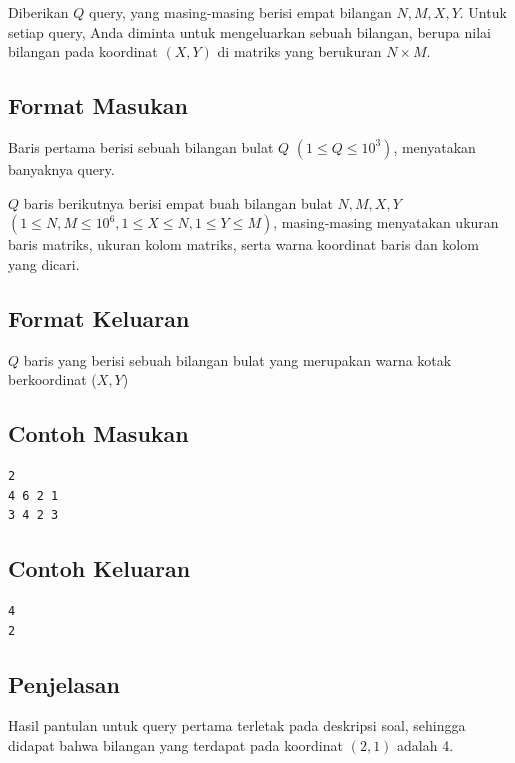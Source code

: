 \documentclass{article}
\begin{document}
Diberikan $Q$ query, yang masing-masing berisi empat bilangan $N, M, X, Y$. Untuk setiap query, Anda diminta untuk mengeluarkan sebuah bilangan, berupa nilai bilangan pada koordinat $(X, Y)$ di matriks yang berukuran $N \times M$.

\subsection*{Format Masukan}
Baris pertama berisi sebuah bilangan bulat $Q$ $(1 \leq Q \leq 10^3)$, menyatakan banyaknya query.

$Q$ baris berikutnya berisi empat buah bilangan bulat $N, M, X, Y$ $(1 \leq N, M \leq 10^6, 1 \leq X \leq N, 1 \leq Y \leq M)$, masing-masing menyatakan ukuran baris matriks, ukuran kolom matriks, serta warna koordinat baris dan kolom yang dicari.

\subsection*{Format Keluaran}
$Q$ baris yang berisi sebuah bilangan bulat yang merupakan warna kotak berkoordinat ($X, Y$)

\begin{multicols}{2}
\subsection*{Contoh Masukan}
\begin{lstlisting}
2
4 6 2 1
3 4 2 3
\end{lstlisting}
\columnbreak
\subsection*{Contoh Keluaran}
\begin{lstlisting}
4
2
\end{lstlisting}
\vfill
\null
\end{multicols}

\subsection*{Penjelasan}
Hasil pantulan untuk query pertama terletak pada deskripsi soal, sehingga didapat bahwa bilangan yang terdapat pada koordinat $(2, 1)$ adalah 4.

\pagebreak
\end{document}
